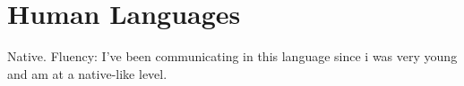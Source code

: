 \section{Human Languages}
{Native.}
{Fluency: I've been communicating in this language since i was very young and am at a native-like level.}
